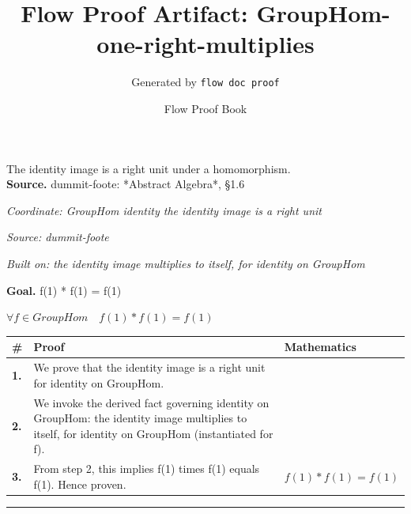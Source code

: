 \documentclass[11pt]{article}
\title{Flow Proof Artifact: GroupHom-one-right-multiplies}
\author{Generated by \texttt{flow doc proof}}
\date{Flow Proof Book}
\theoremstyle{definition}
\begin{document}
\maketitle
The identity image is a right unit under a homomorphism.\\[0.5em]
\textbf{Source.} dummit-foote: *Abstract Algebra*, §1.6\\[0.5em]
\bigskip
{}\par
\smallskip\noindent\textit{Coordinate: GroupHom \cdot identity \cdot the identity image is a right unit}\par
\smallskip\noindent\textit{Source: dummit-foote}\par
\smallskip\noindent\textit{Built on: the identity image multiplies to itself, for identity on GroupHom}\par
\medskip
\noindent\textbf{Goal.} f(1) * f(1) = f(1)\par
\noindent$\displaystyle \forall f \in GroupHom\quad f(1) * f(1) = f(1)$\par
\medskip
\noindent
\begin{tabular}{@{} >{\raggedright\arraybackslash}p{} >{\raggedright\arraybackslash}p{} >{\raggedleft\arraybackslash}p{} @{}}
\textbf{\#} & \textbf{Proof} & \textbf{Mathematics} \\
\midrule
\textbf{1.} & We prove that the identity image is a right unit for identity on GroupHom. & \\[0.45em]
\textbf{2.} & We invoke the derived fact governing identity on GroupHom: the identity image multiplies to itself, for identity on GroupHom (instantiated for f). & \\[0.45em]
\textbf{3.} & From step 2, this implies f(1) times f(1) equals f(1). Hence proven. & $\displaystyle f(1) * f(1) = f(1)$ \\[0.45em]
\bottomrule
\end{tabular}
\label{thm:GroupHom-identity-the_identity_image_is_a_right_unit}
\par\medskip\hrule
\end{document}
